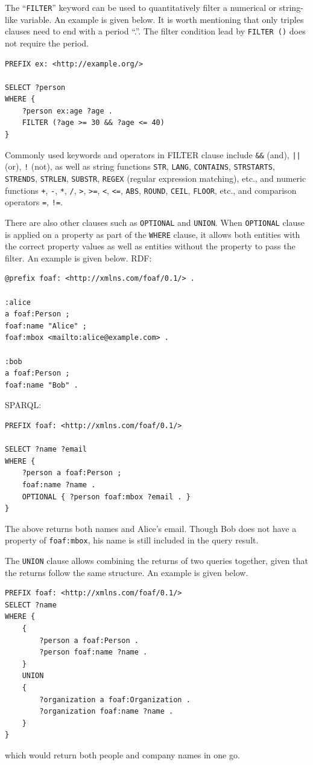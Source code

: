 The ``\verb|FILTER|'' keyword can be used to quantitatively filter a numerical or string-like variable. An example is given below. It is worth mentioning that only triples clauses need to end with a period ``.''. The filter condition lead by \verb|FILTER ()| does not require the period.
\begin{lstlisting}
PREFIX ex: <http://example.org/>

SELECT ?person
WHERE {
	?person ex:age ?age .
	FILTER (?age >= 30 && ?age <= 40)
}
\end{lstlisting}
Commonly used keywords and operators in FILTER clause include \verb|&&| (and), \verb$||$ (or), \verb|!| (not), as well as string functions \verb|STR|, \verb|LANG|, \verb|CONTAINS|, \verb|STRSTARTS|, \verb|STRENDS|, \verb|STRLEN|, \verb|SUBSTR|, \verb|REGEX| (regular expression matching), etc., and numeric functions \verb|+|, \verb|-|, \verb|*|, \verb|/|, \verb|>|, \verb|>=|, \verb|<|, \verb|<=|, \verb|ABS|, \verb|ROUND|, \verb|CEIL|, \verb|FLOOR|, etc., and comparison operators \verb|=|, \verb|!=|.

There are also other clauses such as \verb|OPTIONAL| and \verb|UNION|. When \verb|OPTIONAL| clause is applied on a property as part of the \verb|WHERE| clause, it allows both entities with the correct property values as well as entities without the property to pass the filter. An example is given below. RDF:
\begin{lstlisting}
@prefix foaf: <http://xmlns.com/foaf/0.1/> .

:alice
a foaf:Person ;
foaf:name "Alice" ;
foaf:mbox <mailto:alice@example.com> .

:bob
a foaf:Person ;
foaf:name "Bob" .
\end{lstlisting}
SPARQL:
\begin{lstlisting}
PREFIX foaf: <http://xmlns.com/foaf/0.1/>

SELECT ?name ?email
WHERE {
	?person a foaf:Person ;
	foaf:name ?name .
	OPTIONAL { ?person foaf:mbox ?email . }
}
\end{lstlisting}
The above returns both names and Alice's email. Though Bob does not have a property of \verb|foaf:mbox|, his name is still included in the query result.

The \verb|UNION| clause allows combining the returns of two queries together, given that the returns follow the same structure. An example is given below.
\begin{lstlisting}
PREFIX foaf: <http://xmlns.com/foaf/0.1/>
SELECT ?name
WHERE {
	{
		?person a foaf:Person .
		?person foaf:name ?name .
	}
	UNION
	{
		?organization a foaf:Organization .
		?organization foaf:name ?name .
	}
}
\end{lstlisting}
which would return both people and company names in one go.

